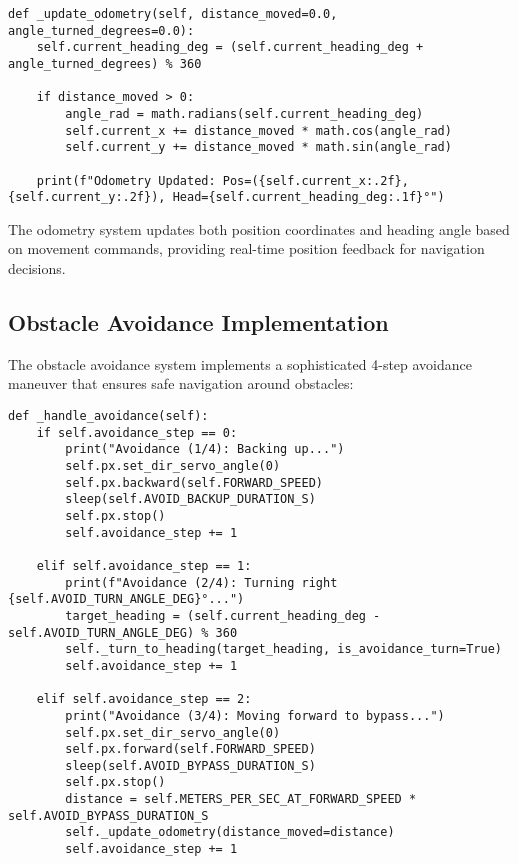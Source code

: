 \documentclass{book}
\begin{document}
\begin{lstlisting}[style=pythonstyle, caption={Odometry Update Function}]
def _update_odometry(self, distance_moved=0.0, angle_turned_degrees=0.0):
    self.current_heading_deg = (self.current_heading_deg + angle_turned_degrees) % 360

    if distance_moved > 0:
        angle_rad = math.radians(self.current_heading_deg)
        self.current_x += distance_moved * math.cos(angle_rad)
        self.current_y += distance_moved * math.sin(angle_rad)

    print(f"Odometry Updated: Pos=({self.current_x:.2f}, {self.current_y:.2f}), Head={self.current_heading_deg:.1f}°")
\end{lstlisting}

\par\noindent The odometry system updates both position coordinates and heading angle based on movement commands, providing real-time position feedback for navigation decisions.

\subsection{Obstacle Avoidance Implementation}

\par\noindent The obstacle avoidance system implements a sophisticated 4-step avoidance maneuver that ensures safe navigation around obstacles:

\begin{lstlisting}[style=pythonstyle, caption={Obstacle Avoidance Logic}]
def _handle_avoidance(self):
    if self.avoidance_step == 0:
        print("Avoidance (1/4): Backing up...")
        self.px.set_dir_servo_angle(0)
        self.px.backward(self.FORWARD_SPEED)
        sleep(self.AVOID_BACKUP_DURATION_S)
        self.px.stop()
        self.avoidance_step += 1

    elif self.avoidance_step == 1:
        print(f"Avoidance (2/4): Turning right {self.AVOID_TURN_ANGLE_DEG}°...")
        target_heading = (self.current_heading_deg - self.AVOID_TURN_ANGLE_DEG) % 360
        self._turn_to_heading(target_heading, is_avoidance_turn=True)
        self.avoidance_step += 1

    elif self.avoidance_step == 2:
        print("Avoidance (3/4): Moving forward to bypass...")
        self.px.set_dir_servo_angle(0)
        self.px.forward(self.FORWARD_SPEED)
        sleep(self.AVOID_BYPASS_DURATION_S)
        self.px.stop()
        distance = self.METERS_PER_SEC_AT_FORWARD_SPEED * self.AVOID_BYPASS_DURATION_S
        self._update_odometry(distance_moved=distance)
        self.avoidance_step += 1
\end{lstlisting}
\end{document}

